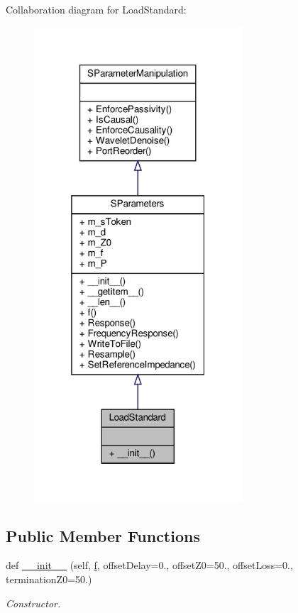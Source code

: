 Collaboration diagram for Load\+Standard\+:\nopagebreak
\begin{figure}[H]
\begin{center}
\leavevmode
\includegraphics[width=220pt]{classSignalIntegrity_1_1Measurement_1_1CalKit_1_1Standards_1_1LoadStandard_1_1LoadStandard__coll__graph}
\end{center}
\end{figure}
\subsection*{Public Member Functions}
\begin{DoxyCompactItemize}
\item 
def \hyperlink{classSignalIntegrity_1_1Measurement_1_1CalKit_1_1Standards_1_1LoadStandard_1_1LoadStandard_a4b50935dab0ed4c6d020795e45433a5c}{\+\_\+\+\_\+init\+\_\+\+\_\+} (self, \hyperlink{classSignalIntegrity_1_1SParameters_1_1SParameters_1_1SParameters_a32e7a34d6837fe949b413c852a0447f8}{f}, offset\+Delay=0., offset\+Z0=50., offset\+Loss=0., termination\+Z0=50.)
\begin{DoxyCompactList}\small\item\em Constructor. \end{DoxyCompactList}\end{DoxyCompactItemize}


